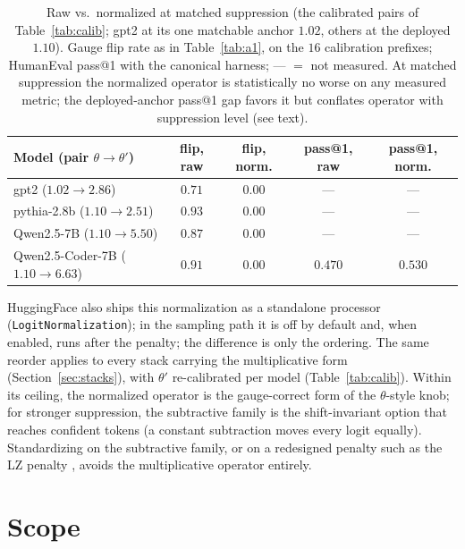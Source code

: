 \documentclass[11pt]{article}
\makeatletter
\newcommand{\thp}{\theta}
\newcommand{\code}[1]{\texttt{#1}}
\newcommand{\passk}[1]{pass@#1}
\makeatother
\begin{document}
\begin{table}[t]
\centering
\caption{Raw vs.\ normalized at matched suppression (the calibrated pairs of
Table~\ref{tab:calib}; gpt2 at its one matchable anchor $1.02$, others at the deployed $1.10$).
Gauge flip rate as in Table~\ref{tab:a1}, on the $16$ calibration prefixes; HumanEval \passk{1}
with the canonical harness; --- $=$ not measured. At matched suppression the normalized operator
is statistically no worse on any measured metric; the deployed-anchor \passk{1} gap favors it
but conflates operator with suppression level (see text).}
\label{tab:matched}
\setlength{\tabcolsep}{4.5pt}
\begin{tabular}{lcccc}
\toprule
Model (pair $\thp\!\to\!\thp'$) & flip, raw & flip, norm. & \passk{1}, raw & \passk{1}, norm. \\
\midrule
gpt2 ($1.02\!\to\!2.86$)              & $0.71$ & $0.00$ & --- & --- \\
pythia-2.8b ($1.10\!\to\!2.51$)       & $0.93$ & $0.00$ & --- & --- \\
Qwen2.5-7B ($1.10\!\to\!5.50$)        & $0.87$ & $0.00$ & --- & --- \\
Qwen2.5-Coder-7B ($1.10\!\to\!6.63$)  & $0.91$ & $0.00$ & $0.470$ & $0.530$ \\
\bottomrule
\end{tabular}
\end{table}


HuggingFace also ships this normalization as a standalone processor
(\code{LogitNormalization}); in the sampling path it is off by default and, when enabled, runs
after the penalty; the difference is only the ordering. The same reorder applies to every stack
carrying the multiplicative form (Section~\ref{sec:stacks}), with $\thp'$ re-calibrated per
model (Table~\ref{tab:calib}). Within its ceiling, the
normalized operator is the gauge-correct form of the $\thp$-style knob; for stronger
suppression, the subtractive family is the shift-invariant option that reaches confident tokens
(a constant subtraction moves every logit equally). Standardizing on the subtractive family, or
on a redesigned penalty such as the LZ penalty \citep{ginart2025lz}, avoids the multiplicative
operator entirely.

\section{Scope}
\end{document}
